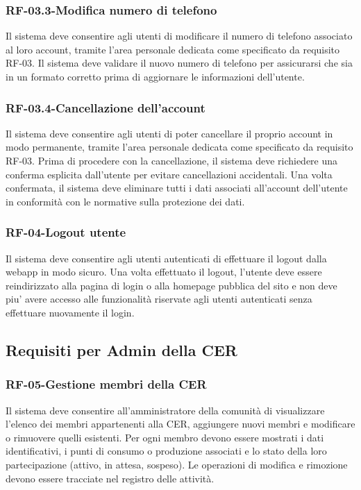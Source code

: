 \subsubsection*{RF-03.3-Modifica numero di telefono}
Il sistema deve consentire agli utenti di modificare il numero di telefono associato al loro account, tramite l'area personale dedicata come specificato da requisito RF-03. Il sistema deve validare il nuovo numero di telefono per assicurarsi che sia in un formato corretto prima di aggiornare le informazioni dell'utente.
\subsubsection*{RF-03.4-Cancellazione dell'account}
Il sistema deve consentire agli utenti di poter cancellare il proprio account in modo permanente, tramite l'area personale dedicata come specificato da requisito RF-03. Prima di procedere con la cancellazione, il sistema deve richiedere una conferma esplicita dall'utente per evitare cancellazioni accidentali. Una volta confermata, il sistema deve eliminare tutti i dati associati all'account dell'utente in conformità con le normative sulla protezione dei dati.
\subsubsection*{RF-04-Logout utente}
Il sistema deve consentire agli utenti autenticati di effettuare il logout dalla webapp in modo sicuro. Una volta effettuato il logout, l'utente deve essere reindirizzato alla pagina di login o alla homepage pubblica del sito e non deve piu' avere accesso alle funzionalità riservate agli utenti autenticati senza effettuare nuovamente il login.
\subsection{Requisiti per Admin della CER}
\subsubsection*{RF-05-Gestione membri della CER}
Il sistema deve consentire all’amministratore della comunità di visualizzare l’elenco dei membri appartenenti alla CER, aggiungere nuovi membri e modificare o rimuovere quelli esistenti. Per ogni membro devono essere mostrati i dati identificativi, i punti di consumo o produzione associati e lo stato della loro partecipazione (attivo, in attesa, sospeso). Le operazioni di modifica e rimozione devono essere tracciate nel registro delle attività.
